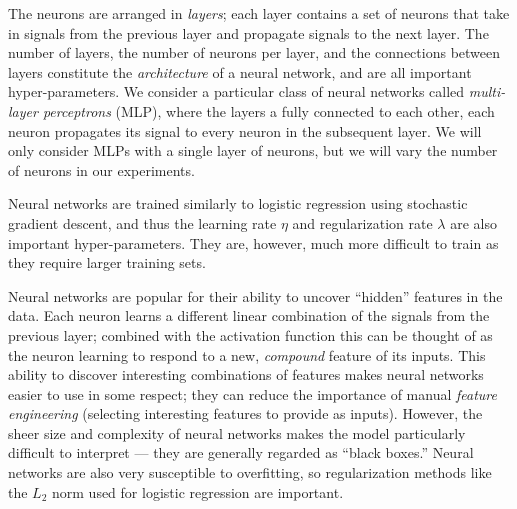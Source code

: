 The neurons are arranged in \emph{layers}; each layer contains a set of
neurons that take in signals from the previous layer and propagate
signals to the next layer.
%
The number of layers, the number of neurons per layer, and the
connections between layers constitute the \emph{architecture} of a
neural network, and are all important hyper-parameters.
%
We consider a particular class of neural networks called
\emph{multi-layer perceptrons} (MLP), where the layers a fully connected to
each other, \ie each neuron propagates its signal to every neuron in the
subsequent layer.
%
We will only consider MLPs with a single layer of neurons, but we will
vary the number of neurons in our experiments.

Neural networks are trained similarly to logistic regression using
stochastic gradient descent, and thus the learning rate $\eta$ and
regularization rate $\lambda$ are also important hyper-parameters.
%
They are, however, much more difficult to train as they require larger
training sets.

Neural networks are popular for their ability to uncover ``hidden''
features in the data.
%
Each neuron learns a different linear combination of the signals from
the previous layer; combined with the activation function this can be
thought of as the neuron learning to respond to a new, \emph{compound}
feature of its inputs.
%
This ability to discover interesting combinations of features makes
neural networks easier to use in some respect; they can reduce the
importance of manual \emph{feature engineering} (selecting interesting
features to provide as inputs).
%
However, the sheer size and complexity of neural networks makes the
model particularly difficult to interpret --- they are generally regarded
as ``black boxes.''
%
Neural networks are also very susceptible to overfitting, so
regularization methods like the $L_2$ norm used for logistic regression
are important.






\lstMakeShortInline{|}

